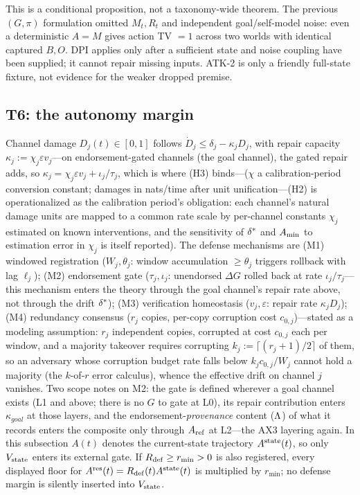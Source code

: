 This is a conditional proposition, not a taxonomy-wide theorem. The previous
$(G,\pi)$ formulation omitted $M_t,R_t$ and independent goal/self-model
noise: even a deterministic $A=M$ gives action TV $=1$ across two worlds with
identical captured $B,O$. DPI applies only after a sufficient state and noise
coupling have been supplied; it cannot repair missing inputs. ATK-2 is only a
friendly full-state fixture, not evidence for the weaker dropped premise.

\subsection{T6: the autonomy margin}\label{sec:t6}

Channel damage $D_j(t)\in[0,1]$ follows $\dot D_j\le\delta_j-\kappa_j D_j$,
with repair capacity $\kappa_j:=\chi_j\varepsilon v_j$---on
endorsement-gated channels (the goal channel), the gated repair adds, so
$\kappa_j=\chi_j\varepsilon v_j+\iota_j/\tau_j$, which is where
\textup{(H3)} binds---($\chi$ a
calibration-period conversion constant; damages in nats/time after unit
unification---\textup{(H2)} is operationalized as the calibration period's
obligation: each channel's natural damage units are mapped to a common rate
scale by per-channel constants $\chi_j$ estimated on known interventions, and
the sensitivity of $\delta^{*}$ and $A_{\min}$ to estimation error in $\chi_j$
is itself reported). The defense mechanisms are (M1) windowed registration
($W_j,\theta_j$: window accumulation $\ge\theta_j$ triggers rollback with lag
$\ell_j$); (M2) endorsement gate ($\tau_j,\iota_j$: unendorsed $\Delta G$
rolled back at rate $\iota_j/\tau_j$---this mechanism enters the theory
through the goal channel's repair rate above, not through the drift
$\delta^{*}$); (M3) verification homeostasis
($v_j,\varepsilon$: repair rate $\kappa_jD_j$); (M4) redundancy consensus
($r_j$ copies, per-copy corruption cost $c_{0,j}$)---stated as a modeling
assumption: $r_j$ independent copies, corrupted at cost $c_{0,j}$ each per
window, and a majority takeover requires corrupting
$k_j:=\lceil(r_j+1)/2\rceil$ of them, so an adversary whose corruption budget
rate falls below $k_jc_{0,j}/W_j$ cannot hold a majority (the $k$-of-$r$
error calculus), whence the effective drift on channel $j$ vanishes.
Two scope notes on M2: the gate is defined wherever a goal channel exists
(L1 and above; there is no $G$ to gate at L0), its repair contribution enters
$\kappa_{goal}$ at those layers, and the endorsement-\emph{provenance} content
($\Lambda$) of what it records enters the composite only through $A_{\mathrm{ref}}$ at
L2---the AX3 layering again. In this subsection $A(t)$ denotes the
current-state trajectory $A^{\mathrm{state}}(t)$, so only $V_{\mathrm{state}}$ enters its external
gate. If $R_{\mathrm{def}}\ge r_{\min}>0$ is also registered, every displayed floor for
$A^{\mathrm{res}}(t)=R_{\mathrm{def}}(t)A^{\mathrm{state}}(t)$ is multiplied by $r_{\min}$; no defense margin
is silently inserted into $V_{\mathrm{state}}$.

